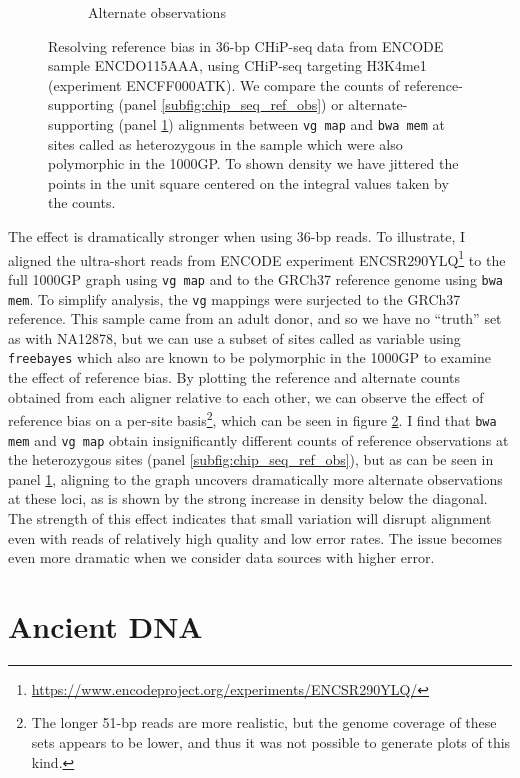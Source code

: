 \begin{figure}[htbp!]
\begin{subfigure}[t]{0.49\textwidth}
    \caption{Alternate observations}
    \label{subfig:chip_seq_alt_obs}
  \end{subfigure}
  \caption[Resolving reference bias in 36-bp CHiP-seq]{
    Resolving reference bias in 36-bp CHiP-seq data from ENCODE sample ENCDO115AAA, using CHiP-seq targeting H3K4me1 (experiment ENCFF000ATK).
    We compare the counts of reference-supporting (panel \ref{subfig:chip_seq_ref_obs}) or alternate-supporting (panel \ref{subfig:chip_seq_alt_obs}) alignments between {\tt vg map} and {\tt bwa mem} at sites called as heterozygous in the sample which were also polymorphic in the 1000GP.
    To shown density we have jittered the points in the unit square centered on the integral values taken by the counts.
   }
\label{fig:chip_seq}
\end{figure}

The effect is dramatically stronger when using 36-bp reads.
To illustrate, I aligned the ultra-short reads from ENCODE experiment ENCSR290YLQ\footnote{\url{https://www.encodeproject.org/experiments/ENCSR290YLQ/}} to the full 1000GP graph using {\tt vg map} and to the GRCh37 reference genome using {\tt bwa mem}.
To simplify analysis, the {\tt vg} mappings were surjected to the GRCh37 reference.
This sample came from an adult donor, and so we have no ``truth'' set as with NA12878, but we can use a subset of sites called as variable using {\tt freebayes} which also are known to be polymorphic in the 1000GP to examine the effect of reference bias.
By plotting the reference and alternate counts obtained from each aligner relative to each other, we can observe the effect of reference bias on a per-site basis\footnote{The longer 51-bp reads are more realistic, but the genome coverage of these sets appears to be lower, and thus it was not possible to generate plots of this kind.}, which can be seen in figure \ref{fig:chip_seq}.
I find that {\tt bwa mem} and {\tt vg map} obtain insignificantly different counts of reference observations at the heterozygous sites (panel \ref{subfig:chip_seq_ref_obs}), but as can be seen in panel \ref{subfig:chip_seq_alt_obs}, aligning to the graph uncovers dramatically more alternate observations at these loci, as is shown by the strong increase in density below the diagonal.
The strength of this effect indicates that small variation will disrupt alignment even with reads of relatively high quality and low error rates.
The issue becomes even more dramatic when we consider data sources with higher error.

\section{Ancient DNA}

